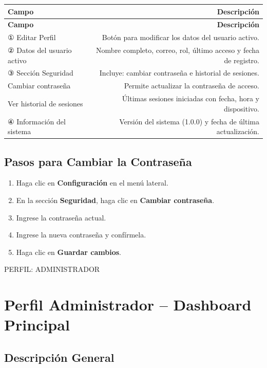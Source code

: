 \documentclass[12pt,a4paper]{article}
\newcommand{\perfilbanner}[1]{%
  \vspace{1em}%
  \noindent\colorbox{navyblue}{\parbox{\linewidth}{\centering\large\bfseries\color{white}\strut #1\strut}}%
  \vspace{0.5em}%
}
\begin{document}
\begin{longtable}{LR}
  \toprule
  \textbf{Campo} & \textbf{Descripción} \\
  \midrule
  \endfirsthead
  \toprule
  \textbf{Campo} & \textbf{Descripción} \\
  \midrule
  \endhead
  \bottomrule
  \endfoot
  ① Editar Perfil             & Botón para modificar los datos del usuario activo. \\[4pt]
  ② Datos del usuario activo  & Nombre completo, correo, rol, último acceso y fecha de registro. \\[4pt]
  ③ Sección Seguridad         & Incluye: cambiar contraseña e historial de sesiones. \\[4pt]
  Cambiar contraseña          & Permite actualizar la contraseña de acceso. \\[4pt]
  Ver historial de sesiones   & Últimas sesiones iniciadas con fecha, hora y dispositivo. \\[4pt]
  ④ Información del sistema   & Versión del sistema (1.0.0) y fecha de última actualización. \\
\end{longtable}

\subsection{Pasos para Cambiar la Contraseña}

\begin{enumerate}[leftmargin=1.5em]
  \item Haga clic en \textbf{Configuración} en el menú lateral.
  \item En la sección \textbf{Seguridad}, haga clic en \textbf{Cambiar contraseña}.
  \item Ingrese la contraseña actual.
  \item Ingrese la nueva contraseña y confírmela.
  \item Haga clic en \textbf{Guardar cambios}.
\end{enumerate}

\perfilbanner{PERFIL: ADMINISTRADOR}

\section{Perfil Administrador -- Dashboard Principal}

\subsection{Descripción General}
\end{document}
